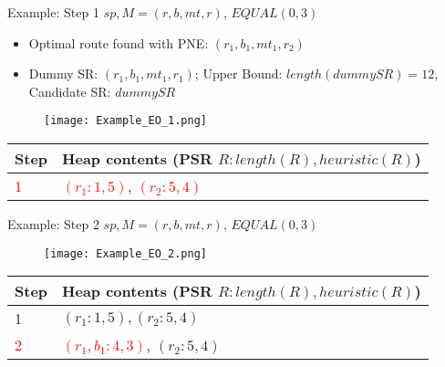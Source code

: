 \begin{frame}{Example: Step 1}
	$sp, M = (r, b, mt, r)$, $EQUAL(0, 3)$
	
	\begin{itemize}
		\item Optimal route found with PNE: $(r_1, b_1, mt_1, r_2)$
		\item Dummy SR: $(r_1, b_1, mt_1, r_1)$; Upper Bound: $length(dummySR) = 12$, Candidate SR: $dummySR$
	\end{itemize}

	\begin{figure}[h]
		\texttt{[image: Example\_EO\_1.png]}
	\end{figure}
	
	\begin{table}[h]
		\centering
		\begin{tabular}{ |l|p{10cm}| } 
			\hline
			Step & Heap contents (PSR $R : length(R), heuristic(R)$) \\
			\hline
			\textcolor{red}{1} & \textcolor{red}{$(r_1 : 1, 5)$}, \textcolor{red}{$(r_2 : 5, 4)$} \\ 
			\hline
		\end{tabular}
	\end{table}
		
\end{frame}

\begin{frame}{Example: Step 2}
	$sp, M = (r, b, mt, r)$, $EQUAL(0, 3)$

	\begin{figure}[h]
		\texttt{[image: Example\_EO\_2.png]}
	\end{figure}
	
	\begin{table}[h]
		\centering
		\begin{tabular}{ |l|p{10cm}| } 
			\hline
			Step & Heap contents (PSR $R : length(R), heuristic(R)$) \\
			\hline
			1 & $(r_1 : 1, 5), (r_2 : 5, 4)$ \\ 
			\hline
			\textcolor{red}{2} & \textcolor{red}{$(r_1, b_1 : 4, 3)$}, $(r_2 : 5, 4)$ \\ 
			\hline
		\end{tabular}
	\end{table}

\end{frame}


